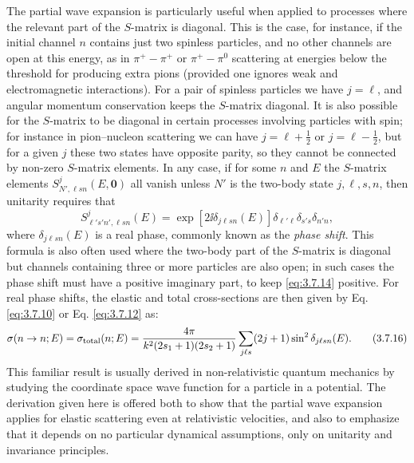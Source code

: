 The partial wave expansion is particularly useful when applied to processes
where the relevant part of the $S$-matrix is diagonal. This is the case, for
instance, if the initial channel $n$ contains just two spinless particles, and
no other channels are open at this energy, as in $\pi^+-\pi^+$ or
$\pi^+-\pi^0$ scattering at energies below the threshold for producing extra
pions (provided one ignores weak and electromagnetic interactions). For a
pair of spinless particles we have $j=\ell$, and angular momentum conservation
keeps the $S$-matrix diagonal. It is also possible for the $S$-matrix to be
diagonal in certain processes involving particles with spin; for instance in
pion--nucleon scattering we can have $j=\ell+\tfrac12$ or
$j=\ell-\tfrac12$, but for a given $j$ these two states have opposite parity,
so they cannot be connected by non-zero $S$-matrix elements. In any case, if
for some $n$ and $E$ the $S$-matrix elements
$S^j_{N',\ell sn}(E,\mathbf0)$ all vanish unless $N'$ is the two-body state
$j,\ell,s,n$, then unitarity requires that
\begin{equation}
  S^j_{\ell's'n',\ell sn}(E)
  =\exp[2\ii\delta_{j\ell sn}(E)]
    \delta_{\ell'\ell}\delta_{s's}\delta_{n'n},
  \tag{3.7.15}\label{eq:3.7.15}
\end{equation}
where $\delta_{j\ell sn}(E)$ is a real phase, commonly known as the
\emph{phase shift}. This formula is also often used where the two-body part of
the $S$-matrix is diagonal but channels containing three or more particles are
also open; in such cases the phase shift must have a positive imaginary part,
to keep \eqref{eq:3.7.14} positive. For real phase shifts, the elastic and total
cross-sections are then given by Eq. \eqref{eq:3.7.10} or Eq. \eqref{eq:3.7.12} as:
\begin{equation}
  \sigma(n\to n;E)=\sigma_{\rm total}(n;E)
  =\frac{4\pi}{k^2(2s_1+1)(2s_2+1)}
    \sum_{j\ell s}(2j+1)\sin^2\delta_{j\ell sn}(E).
  \tag{3.7.16}\label{eq:3.7.16}
\end{equation}
This familiar result is usually derived in non-relativistic quantum mechanics
by studying the coordinate space wave function for a particle in a potential.
The derivation given here is offered both to show that the partial wave
expansion applies for elastic scattering even at relativistic velocities, and
also to emphasize that it depends on no particular dynamical assumptions,
only on unitarity and invariance principles.

